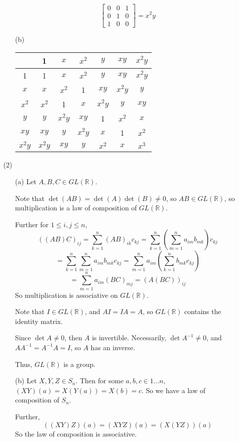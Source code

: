\documentclass[12pt]{article}
\begin{document}
\begin{itemize}
\begin{itemize}
$$\begin{bmatrix}
0 & 0 & 1 \\
0 & 1 & 0 \\
1 & 0 & 0
\end{bmatrix} = x^2y$$
\item[(b)]
\begin{tabular}{| c || c | c | c | c | c | c |}
\hline
& 1 & $x$ & $x^2$ & $y$ & $xy$ & $x^2y$ \\
\hline \hline
1 & 1 & $x$ & $x^2$ & $y$ & $xy$ & $x^2y$ \\
\hline
$x$ & $x$ & $x^2$ & 1 & $xy$ & $x^2y$ & $y$ \\
\hline
$x^2$ & $x^2$ & 1 & $x$ & $x^2y$ & $y$ & $xy$ \\
\hline
$y$ & $y$ & $x^2y$ & $xy$ & 1 & $x^2$ & $x$ \\
\hline
$xy$ & $xy$ & $y$ & $x^2y$ & $x$ & 1 & $x^2$ \\
\hline
$x^2y$ & $x^2y$ & $xy$ & $y$ & $x^2$ & $x$ & $x^3$ \\
\hline
\end{tabular}
\end{itemize}
\item[(2)]
\begin{itemize}
\item[(a)]
Let $A, B, C \in GL(\mathbb{R})$. 

Note that $\det(AB) = \det(A)\det(B) \neq 0$, so $AB \in GL(\mathbb{R})$, so multiplication is a law of composition of $GL(\mathbb{R})$.

Further for $1 \leq i,j \leq n$,
$$((AB)C)_{ij} = \sum_{k=1}^n (AB)_{ik}c_{kj} = \sum_{k=1}^n\left(\sum_{m=1}^n a_{im}b_{mk}\right)c_{kj} $$
$$= \sum_{k=1}^n\sum_{m=1}^n a_{im}b_{mk}c_{kj} = \sum_{m=1}^na_{im}\left(\sum_{k=1}^n b_{mk}c_{kj}\right)$$
$$= \sum_{m=1}^na_{im}(BC)_{mj} = (A(BC))_{ij}$$
So multiplication is associative on $GL(\mathbb{R})$.

Note that $I \in GL(\mathbb{R})$, and $AI = IA = A$, so $GL(\mathbb{R})$ contains the identity matrix.

Since $\det A \neq 0$, then $A$ is invertible. Necessarily, $\det A^{-1} \neq 0$, and $AA^{-1} = A^{-1}A = I$, so $A$ has an inverse. 

Thus, $GL(\mathbb{R})$ is a group.
\item[(b)]
Let $X, Y, Z \in S_n$. Then for some $a, b, c \in 1...n$, $(XY)(a) = X(Y(a)) = X(b) = c$. So we have a law of composition of $S_n$.

Further,
$$((XY)Z)(a) = (XYZ)(a) = (X(YZ))(a)$$
So the law of composition is associative.


\end{itemize}
\end{itemize}
\end{document}
